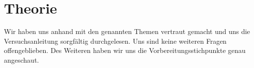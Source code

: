 \section{Theorie}
\label{sec:theorie}
Wir haben uns anhand \cite{Bleckwedel.Mathe2,Dorn.2008,Turtur.Sommersemester2017} mit den genannten Themen vertraut gemacht und uns die Versuchsanleitung sorgfältig durchgelesen. Uns sind keine weiteren Fragen offengeblieben.
Des Weiteren haben wir uns die Vorbereitungsstichpunkte genau angeschaut.